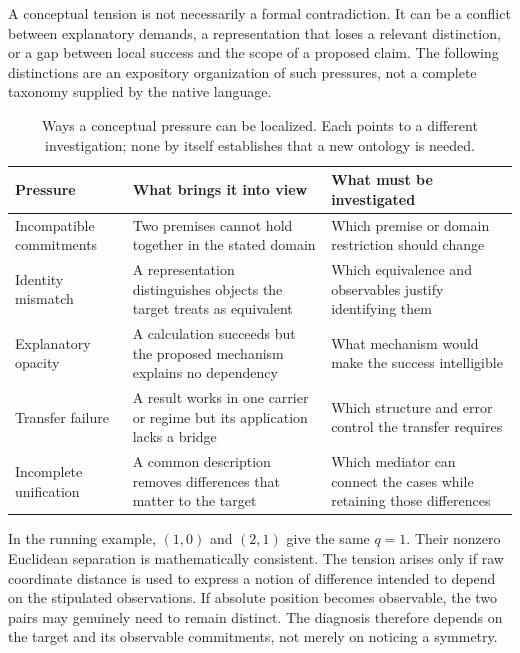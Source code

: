 A conceptual tension is not necessarily a formal contradiction. It can be a
conflict between explanatory demands, a representation that loses a relevant
distinction, or a gap between local success and the scope of a proposed claim.
The following distinctions are an expository organization of such pressures,
not a complete taxonomy supplied by the native language.

\begin{table}[htbp]
\centering\small
\begin{tabularx}{\linewidth}{@{}>{\raggedright\arraybackslash}p{.23\linewidth}>{\raggedright\arraybackslash}X>{\raggedright\arraybackslash}X@{}}
\toprule
Pressure & What brings it into view & What must be investigated \\
\midrule
Incompatible commitments & Two premises cannot hold together in the stated domain & Which premise or domain restriction should change \\
Identity mismatch & A representation distinguishes objects the target treats as equivalent & Which equivalence and observables justify identifying them \\
Explanatory opacity & A calculation succeeds but the proposed mechanism explains no dependency & What mechanism would make the success intelligible \\
Transfer failure & A result works in one carrier or regime but its application lacks a bridge & Which structure and error control the transfer requires \\
Incomplete unification & A common description removes differences that matter to the target & Which mediator can connect the cases while retaining those differences \\
\bottomrule
\end{tabularx}
\caption{Ways a conceptual pressure can be localized. Each points to a different
investigation; none by itself establishes that a new ontology is needed.}
\label{tab:conceptual-pressures}
\end{table}

In the running example, $(1,0)$ and $(2,1)$ give the same $q=1$. Their nonzero
Euclidean separation is mathematically consistent. The tension arises only if raw
coordinate distance is used to express a notion of difference intended to depend
on the stipulated observations. If absolute position becomes observable, the two
pairs may genuinely need to remain distinct. The diagnosis therefore depends on
the target and its observable commitments, not merely on noticing a symmetry.

